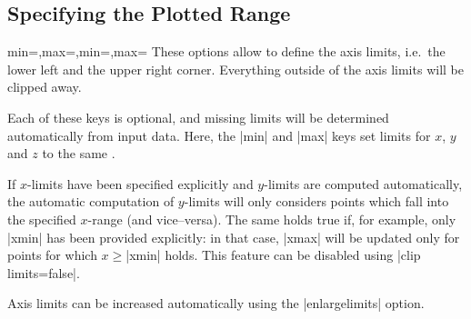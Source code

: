 

\subsection{Specifying the Plotted Range}

\begin{pgfplotsxykeylist}{\x min=,\x max=,min=,max=}
These options allow to define the axis limits, i.e.\ the lower left and the upper right corner. Everything outside of the axis limits will be clipped away.

Each of these keys is optional, and missing limits will be determined automatically from input data. Here, the |min| and |max| keys set limits for $x$, $y$ and $z$ to the same .

If $x$-limits have been specified explicitly and $y$-limits are computed automatically, the automatic computation of $y$-limits will only considers points which fall into the specified $x$-range (and vice--versa). The same holds true if, for example, only |xmin| has been provided explicitly: in that case, |xmax| will be updated only for points for which $x \ge $|xmin| holds. This feature can be disabled using |clip limits=false|. 

Axis limits can be increased automatically using the |enlargelimits| option.
\begin{codeexample}[]
\end{codeexample}

\begin{codeexample}[]
\end{codeexample}

\begin{codeexample}[]
\end{codeexample}


\end{pgfplotsxykeylist}

